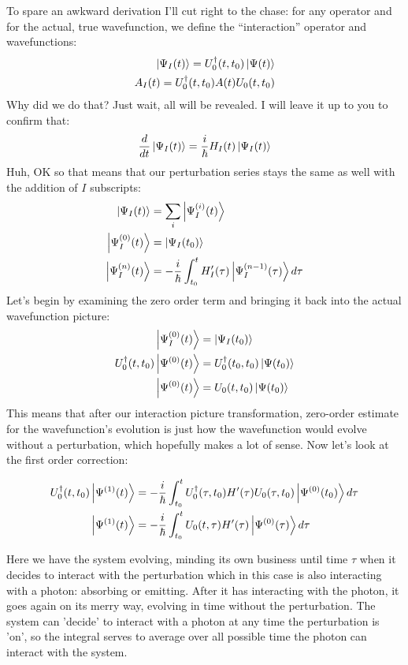 To spare an awkward derivation I'll cut right to the chase: for any operator and for the actual, true wavefunction, we define the ``interaction'' operator and wavefunctions:
\begin{align}
	\Ket{\Psi_I(t)} = U_0^{\dagger}(t, t_0) \Ket{\Psi(t)} \\
	A_I(t) = U_0^{\dagger}(t, t_0) A(t) U_0(t, t_0)
\end{align}
Why did we do that?  Just wait, all will be revealed.  I will leave it up to you to confirm that:
\begin{align}
	\frac{d}{dt} \Ket{\Psi_I(t)} = \frac{i}{\hbar} H_I (t) \Ket{\Psi_I(t)}
\end{align}
Huh, OK so that means that our perturbation series stays the same as well with the addition of $I$ subscripts:
\begin{align}
	\Ket{\Psi_I(t)} &= \sum_{i} \Ket{\Psi_I^{(i)} (t)} \\
	\Ket{\Psi_I^{(0)} (t)} &= \Ket{\Psi_I(t_0)} \\
	\Ket{\Psi_I^{(n)} (t)} &= - \frac{i}{\hbar} \int_{t_0}^{t} H'_I(\tau)  \Ket{\Psi_I^{(n-1)} (\tau)} d\tau
\end{align}
Let's begin by examining the zero order term and bringing it back into the actual wavefunction picture:
\begin{align}
	\Ket{\Psi_I^{(0)} (t)} &= \Ket{\Psi_I(t_0)} \\
	U_0^{\dagger}(t, t_0)\Ket{\Psi^{(0)} (t)} &= U_0^{\dagger}(t_0, t_0) \Ket{\Psi(t_0)} \\
	\Ket{\Psi^{(0)} (t)} &= U_0(t, t_0) \Ket{\Psi(t_0)}
\end{align}
This means that after our interaction picture transformation, zero-order estimate for the wavefunction's evolution is just how the wavefunction would evolve without a perturbation, which hopefully makes a lot of sense. Now let's look at the first order correction:

\begin{align}
	U_0^{\dagger}(t, t_0)\Ket{\Psi^{(1)} (t)} &= - \frac{i}{\hbar} \int_{t_0}^{t} U_0^{\dagger}(\tau, t_0) H'(\tau) U_0(\tau, t_0)  \Ket{\Psi^{(0)}(t_0)} d\tau \\
	\Ket{\Psi^{(1)} (t)} &=- \frac{i}{\hbar} \int_{t_0}^{t} U_0(t, \tau) H'(\tau)  \Ket{\Psi^{(0)}(\tau)} d\tau
\end{align}

Here we have the system evolving, minding its own business until time $\tau$ when it decides to interact with the perturbation which in this case is also interacting with a photon: absorbing or emitting.  After it has interacting with the photon, it goes again on its merry way, evolving in time without the perturbation.  The system can 'decide' to interact with a photon at any time the perturbation is 'on', so the integral serves to average over all possible time the photon can interact with the system.

